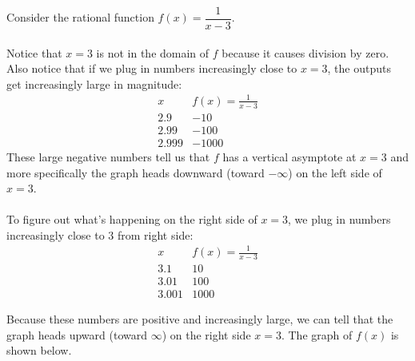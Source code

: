 \documentclass{ximera}
\begin{document}

\begin{example}
Consider the rational function $f(x)=\dfrac{1}{x-3}$.
\\
\\Notice that $x=3$ is not in the domain of $f$ because it causes division by zero. Also notice that if we plug in numbers increasingly close to $x=3$, the outputs get increasingly large in magnitude: 
\[ \begin{array}{c|c}
		x       & f(x)=\frac{1}{x-3} \\\hline
		2.9      &  -10\\ 
		2.99     &  -100\\
		2.999    &  -1000
	\end{array} \]
These large negative numbers tell us that $f$ has a vertical asymptote at $x=3$ and more specifically the graph heads downward (toward $-\infty$) on the left side of $x=3$.
\\
\\To figure out what's happening on the right side of $x=3$, we plug in numbers increasingly close to $3$ from right side: 
\[ \begin{array}{c|c}
		x       & f(x)=\frac{1}{x-3} \\\hline
		3.1   &  10\\
		3.01  & 100\\
		3.001 & 1000
	\end{array} \]

Because these numbers are positive and increasingly large, we can tell that the graph heads upward (toward $\infty$) on the right side $x=3$. The graph of $f(x)$ is shown below.

\begin{center}\end{center}
\end{example}
\end{document}
